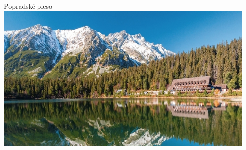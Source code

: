 \documentclass{beamer}
\begin{document}
\begin{frame}
{\begin{columns}
\begin{column}{0.5\textwidth}
				\end{column}
				\begin{column}{0.5\textwidth}
				Popradské pleso
				\includegraphics[width=\textwidth]{day3/pleso2}
				\end{column}
			\end{columns}
		}
	\end{frame}
	
\end{document}
